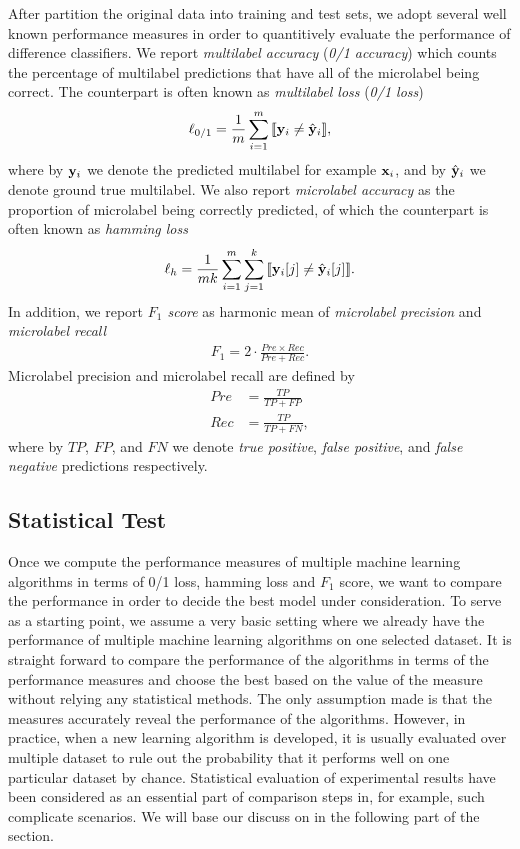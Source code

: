 {After partition the original data into training and test sets, we adopt several well known performance measures in order to quantitively evaluate the performance of difference classifiers.
We report \textit{multilabel accuracy} (\textit{0/1 accuracy}) which counts the percentage of multilabel predictions that have all of the microlabel being correct.
The counterpart is often known as \textit{multilabel loss} (\textit{0/1 loss})
\begin{align*}
	\ell_{0/1} = \frac{1}{m}\sum_{i=1}^{m}{\llbracket \mathbf {y}_i \neq \hat{\mathbf {y}}_i \rrbracket},
\end{align*}
where by $\mathbf {y}_i$ we denote the predicted multilabel for example $\mathbf {x}_i$, and by $\hat{\mathbf {y}}_i$ we denote ground true multilabel.
We also report \textit{microlabel accuracy} as the proportion of microlabel being correctly predicted, of which the counterpart is often known as \textit{hamming loss}
\begin{align*}
	\ell_{h} = \frac{1}{mk}\sum_{i=1}^{m}\sum_{j=1}^{k}{\llbracket \mathbf {y}_i[j] \neq \hat{\mathbf {y}}_i[j] \rrbracket}.
\end{align*}
In addition, we report \textit{$F_1$ score} as harmonic mean of \textit{microlabel precision} and \textit{microlabel recall}
\begin{align*}
	F_1 = 2\cdot\frac{Pre\times Rec}{Pre+Rec}.
\end{align*}
Microlabel precision and microlabel recall are defined by
\begin{align*}
	Pre &= \frac{TP}{TP+FP}\\
	Rec &= \frac{TP}{TP+FN},
\end{align*}
where by $TP$, $FP$, and $FN$ we denote \textit{true positive}, \textit{false positive}, and \textit{false negative} predictions respectively.

%
%
\subsection{Statistical Test}

Once we compute the performance measures of multiple machine learning algorithms in terms of 0/1 loss, hamming loss and $F_1$ score, we want to compare the performance in order to decide the best model under consideration. 
To serve as a starting point, we assume a very basic setting where we already have the performance of multiple machine learning algorithms on one selected dataset.
It is straight forward to compare the performance of the algorithms in terms of the performance measures and choose the best based on the value of the measure without relying any statistical methods.
The only assumption made is that the measures accurately reveal the performance of the algorithms.
However, in practice, when a new learning algorithm is developed, it is usually evaluated over multiple dataset to rule out the probability that it performs well on one particular dataset by chance.
Statistical evaluation of experimental results have been considered as an essential part of comparison steps in, for example, such complicate scenarios.
We will base our discuss on \citep{Demsar06statistical,Garcia08an} in the following part of the section.

}
